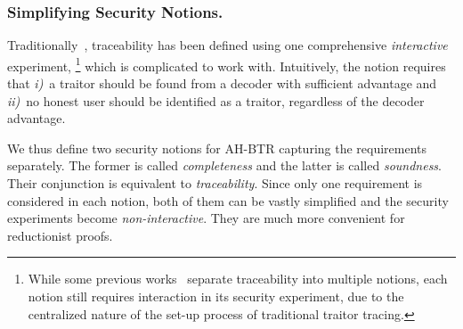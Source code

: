 \subsubsection{Simplifying Security Notions.}
Traditionally~\cite{EC:BonSahWat06}, traceability has been defined using one comprehensive \emph{interactive} experiment,%
\footnote{While some previous works~\cite{C:BonFra99,STOC:GoyKopWat18,C:Zhandry20} separate traceability into multiple notions,
each notion still requires interaction in its security experiment,
due to the centralized nature of
the set-up process of traditional traitor tracing.}
which is complicated to work with.
Intuitively, the notion requires that
\emph{i)}~a traitor should be found from a decoder with sufficient advantage and
\emph{ii)}~no honest user should be identified as a traitor, regardless of the decoder advantage.

We thus define two security notions for AH-BTR capturing the requirements separately.
The former is called \emph{completeness} and the latter is called \emph{soundness}.
Their conjunction is equivalent to \emph{traceability}.
Since only one requirement is considered in each notion,
both of them can be vastly simplified and
the security experiments become \emph{non-interactive}.
They are much more convenient for reductionist proofs.
